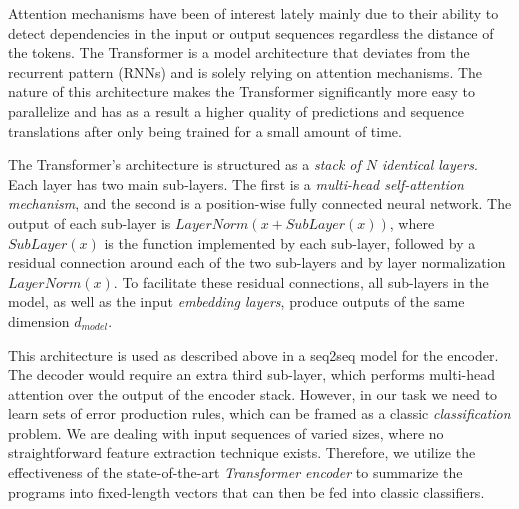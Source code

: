 Attention mechanisms have been of interest lately \citep{Bahdanau2015, Kim2017,
Vaswani_2017} mainly due to their ability to detect dependencies in the input or
output sequences regardless the distance of the tokens. The Transformer is a
model architecture that deviates from the recurrent pattern (\eg RNNs) and is
solely relying on attention mechanisms. The nature of this architecture makes
the Transformer significantly more easy to parallelize and has as a result a
higher quality of predictions and sequence translations after only being trained
for a small amount of time.

The Transformer's architecture is structured as a \emph{stack of $N$ identical
layers}. Each layer has two main sub-layers. The first is a \emph{multi-head
self-attention mechanism}, and the second is a position-wise fully connected
neural network. The output of each sub-layer is $LayerNorm(x + SubLayer(x))$,
where $SubLayer(x)$ is the function implemented by each sub-layer, followed by a
residual connection around each of the two sub-layers and  by layer
normalization $LayerNorm(x)$. To facilitate these residual connections, all
sub-layers in the model, as well as the input \emph{embedding layers}, produce
outputs of the same dimension $d_{model}$.

This architecture is used as described above in a seq2seq model
\citep{Vaswani_2017} for the encoder. The decoder would require an extra third
sub-layer, which performs multi-head attention over the output of the encoder
stack. However, in our task we need to learn sets of error production rules,
which can be framed as a classic \emph{classification} problem. We are dealing
with input sequences of varied sizes, where no straightforward feature
extraction technique exists. Therefore, we utilize the effectiveness of the
state-of-the-art \emph{Transformer encoder} to summarize the programs into
fixed-length vectors that can then be fed into classic \dnn{} classifiers.


